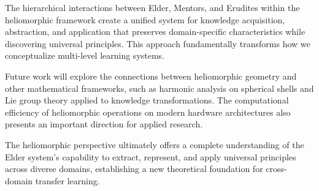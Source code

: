 The hierarchical interactions between Elder, Mentors, and Erudites within the heliomorphic framework create a unified system for knowledge acquisition, abstraction, and application that preserves domain-specific characteristics while discovering universal principles. This approach fundamentally transforms how we conceptualize multi-level learning systems.

Future work will explore the connections between heliomorphic geometry and other mathematical frameworks, such as harmonic analysis on spherical shells and Lie group theory applied to knowledge transformations. The computational efficiency of heliomorphic operations on modern hardware architectures also presents an important direction for applied research.

The heliomorphic perspective ultimately offers a complete understanding of the Elder system's capability to extract, represent, and apply universal principles across diverse domains, establishing a new theoretical foundation for cross-domain transfer learning.